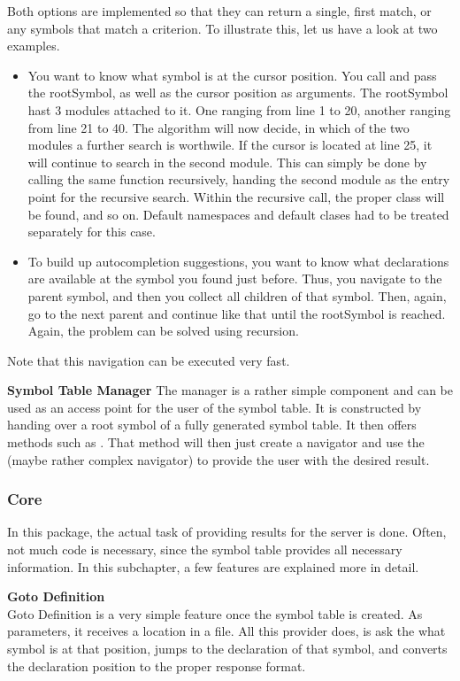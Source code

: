 Both options are implemented so that they can return a single, first match, or any symbols that match a criterion. To illustrate this, let us have a look at two examples.
\begin{itemize}
    \item You want to know what symbol is at the cursor position. You call  and pass the rootSymbol, as well as the cursor position as arguments. The rootSymbol hast 3 modules attached to it. One ranging from line 1 to 20, another ranging from line 21 to 40. The algorithm will now decide, in which of the two modules a further search is worthwile. If the cursor is located at line 25, it will continue to search in the second module. This can simply be done by calling the same function recursively, handing the second module as the entry point for the recursive search. Within the recursive call, the proper class will be found, and so on. Default namespaces and default clases had to be treated separately for this case.
    \item To build up autocompletion suggestions, you want to know what declarations are available at the symbol you found just before. Thus, you navigate to the parent symbol, and then you collect all children of that symbol. Then, again, go to the next parent and continue like that until the rootSymbol is reached. Again, the problem can be solved using recursion.
\end{itemize}
Note that this navigation can be executed very fast.

\textbf{Symbol Table Manager}
The manager is a rather simple component and can be used as an access point for the user of the symbol table. It is constructed by handing over a root symbol of a fully generated symbol table. It then offers methods such as . That method will then just create a navigator and use the (maybe rather complex navigator) to provide the user with the desired result.


\subsubsection{Core}
In this package, the actual task of providing results for the server is done. Often, not much code is necessary, since the symbol table provides all necessary information. In this subchapter, a few features are explained more in detail.

\textbf{Goto Definition}\\
Goto Definition is a very simple feature once the symbol table is created. As parameters, it receives a location in a file. All this provider does, is ask the  what symbol is at that position, jumps to the declaration of that symbol, and converts the declaration position to the proper response format.

